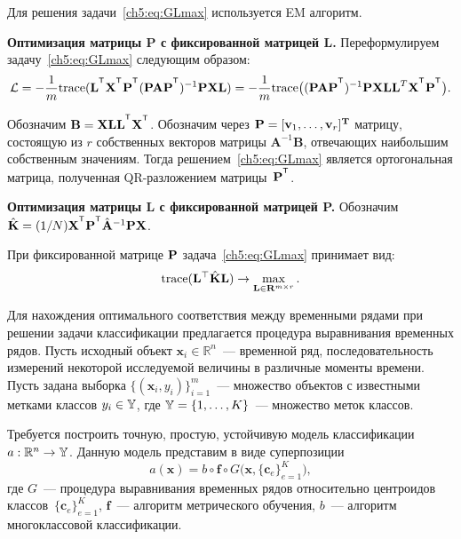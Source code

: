 \documentclass[11pt, a5paper]{dissert}
\begin{document}
Для решения задачи~\eqref{ch5:eq:GLmax} используется EM алгоритм.

\textbf{Оптимизация матрицы P с фиксированной матрицей L.}
Переформулируем задачу~\eqref{ch5:eq:GLmax} следующим образом:
\[
	\cL = -\frac{1}{m} \text{trace} (\mathbf{L}^{\T} \bX^{\T} \bP^{\T} (\bP \mathbf{A} \bP^{\T})^{-1} \bP \bX \mathbf{L}) = -\frac{1}{m} \text{trace} \bigl((\bP \mathbf{A} \bP^{\T})^{-1} \bP \bX \mathbf{LL}^{T} \bX^{\T} \bP^{\T}\bigr).
\]
\begin{statement}
	Обозначим $\mathbf{B} = \bX \mathbf{LL}^{\T} \bX^{\T}$.
	Обозначим через $\mathbf{P} = [\mathbf{v}_1, \ldots, \mathbf{v}_r]^{\mathbf{T}}$ матрицу, состоящую из $r$ собственных векторов матрицы $\mathbf{A}^{-1}\mathbf{B}$, отвечающих наибольшим собственным значениям.
	Тогда решением~\eqref{ch5:eq:GLmax} является ортогональная матрица, полученная QR-разложением матрицы~$\bP^{\T}$.
\end{statement}

\textbf{Оптимизация матрицы L с фиксированной матрицей P.}
Обозначим $\hat{\mathbf{K}} = (1/N)\bX^{\T} \bP^{\T} \hat{\mathbf{A}}^{-1} \bP \bX$.

При фиксированной матрице $\mathbf{P}$ задача~\eqref{ch5:eq:GLmax} принимает вид:
\begin{equation*}
	\text{trace} (\mathbf{L}^{\top} \hat{\mathbf{K}} \mathbf{L}) \to \max_{\mathbf{L} \in \mathbf{R}^{m \times r}}.
\end{equation*}

Для нахождения оптимального соответствия между временными рядами при решении задачи классификации предлагается процедура выравнивания временных рядов.
Пусть исходный объект $\mathbf{x}_i \in \mathbb{R}^n$~--- временной ряд, последовательность измерений некоторой исследуемой величины в различные моменты времени.
Пусть задана выборка $\{(\mathbf{x}_i, y_i)\}_{i=1}^m$~--- множество объектов с известными метками классов $y_i \in \mathbb{Y}$, где $\mathbb{Y} = \{1, \dots, K\}$~--- множество меток классов.

Требуется построить точную, простую, устойчивую модель классификации $a: \mathbb{R}^n \to \mathbb{Y}$.
Данную модель представим в виде суперпозиции
\begin{equation*}
	a(\mathbf{x}) = b \circ \mathbf{f} \circ G\bigl(\mathbf{x}, \{\mathbf{c}_e\}_{e = 1} ^ K\bigr),
\end{equation*}
где $G$~--- процедура выравнивания временных рядов относительно центроидов классов~$\{\mathbf{c}_e\}_{e = 1} ^ K$, $\mathbf{f}$~--- алгоритм метрического обучения, $b$~--- алгоритм многоклассовой классификации.
\end{document}
